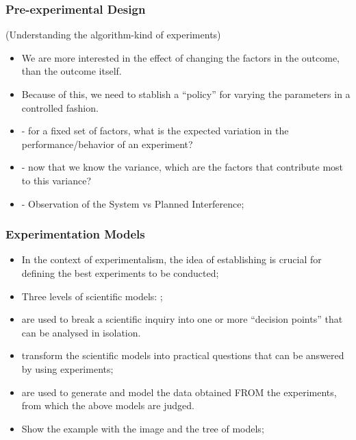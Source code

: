 \documentclass{beamer}
\begin{document}
\begin{frame}
  \frametitle{Pre-experimental Design}
  (Understanding the algorithm-kind of experiments)
  \begin{itemize}
  \item We are more interested in the effect of changing the factors
    in the outcome, than the outcome itself.
  \item Because of this, we need to stablish a ``policy'' for varying
    the parameters in a controlled fashion.
  \item {} - for a fixed set of factors,
    what is the expected variation in the performance/behavior of an
    experiment?
  \item {} - now that we know the
    variance, which are the factors that contribute most to this
    variance?
  \item {} - Observation of the
    System vs Planned Interference;
  \end{itemize}
\end{frame}

\begin{frame}
  \frametitle{Experimentation Models}
  \begin{itemize}
  \item In the context of experimentalism, the idea of establishing
     is crucial for defining the best
    experiments to be conducted;
  \item Three levels of scientific models: ;
  \item {} are used to break a scientific
    inquiry into one or more ``decision points'' that can be analysed
    in isolation.
  \item {} transform the scientific
    models into practical questions that can be answered by using
    experiments;
  \item {} are used to generate and model the
    data obtained FROM the experiments, from which the above models
    are judged.
  \item Show the example with the image and the tree of models;
  \end{itemize}
\end{frame}
\end{document}
